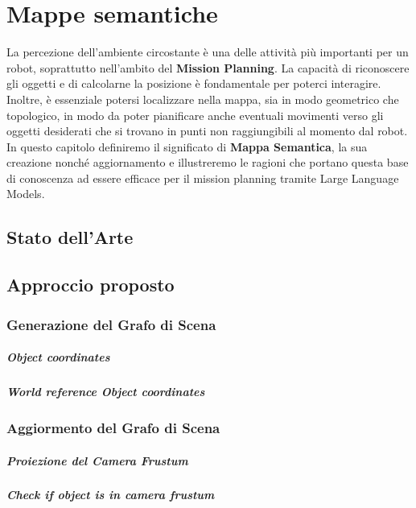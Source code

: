 \chapter{Mappe semantiche}

La percezione dell'ambiente circostante è una delle attività più importanti per un robot, soprattutto nell'ambito del \textbf{Mission Planning}. La capacità di riconoscere gli oggetti e di calcolarne la posizione è fondamentale per poterci interagire. Inoltre, è essenziale potersi localizzare nella mappa, sia in modo geometrico che topologico, in modo da poter pianificare anche eventuali movimenti verso gli oggetti desiderati che si trovano in punti non raggiungibili al momento dal robot. In questo capitolo definiremo il significato di \textbf{Mappa Semantica}, la sua creazione nonché aggiornamento e illustreremo le ragioni che portano questa base di conoscenza ad essere efficace per il mission planning tramite Large Language Models.

\section{Stato dell'Arte}



\section{Approccio proposto}


\subsection{Generazione del Grafo di Scena}
\paragraph{Object coordinates}
\paragraph{World reference Object coordinates}

\subsection{Aggiormento del Grafo di Scena}
\paragraph{Proiezione del Camera Frustum}
\paragraph{Check if object is in camera frustum}


